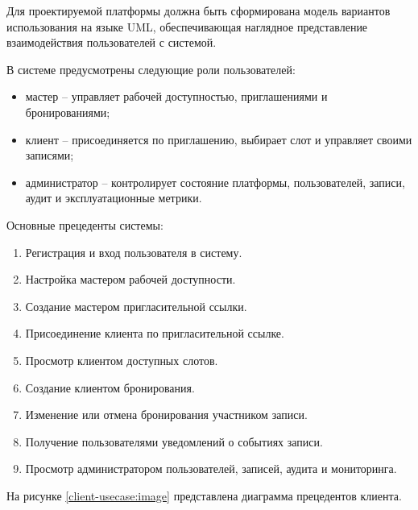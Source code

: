 Для проектируемой платформы должна быть сформирована модель вариантов использования на языке UML, обеспечивающая наглядное представление взаимодействия пользователей с системой.

В системе предусмотрены следующие роли пользователей:
\begin{itemize}
\item мастер -- управляет рабочей доступностью, приглашениями и бронированиями;
\item клиент -- присоединяется по приглашению, выбирает слот и управляет своими записями;
\item администратор -- контролирует состояние платформы, пользователей, записи, аудит и эксплуатационные метрики.
\end{itemize}

Основные прецеденты системы:
\begin{enumerate}
\item Регистрация и вход пользователя в систему.
\item Настройка мастером рабочей доступности.
\item Создание мастером пригласительной ссылки.
\item Присоединение клиента по пригласительной ссылке.
\item Просмотр клиентом доступных слотов.
\item Создание клиентом бронирования.
\item Изменение или отмена бронирования участником записи.
\item Получение пользователями уведомлений о событиях записи.
\item Просмотр администратором пользователей, записей, аудита и мониторинга.
\end{enumerate}

На рисунке \ref{client-usecase:image} представлена диаграмма прецедентов клиента.

